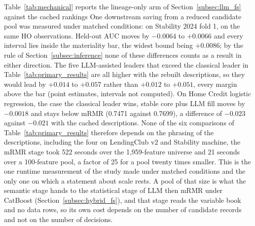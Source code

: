 \documentclass[final,5p,twocolumn]{elsarticle}
\providecommand{\DIFaddtex}[1]{{\protect\color{blue} \sf #1}} %
\providecommand{\DIFdeltex}[1]{{\protect\color{red} \scriptsize #1}} %
\providecommand{\DIFaddbegin}{} %
\providecommand{\DIFaddend}{} %
\providecommand{\DIFdelbegin}{} %
\providecommand{\DIFdelend}{} %
\providecommand{\DIFadd}[1]{\texorpdfstring{\DIFaddtex{#1}}{#1}} %
\providecommand{\DIFdel}[1]{\texorpdfstring{\DIFdeltex{#1}}{}} %
\begin{document}
\DIFdelbegin \DIFdel{Table~\ref{tab:mechanical} reports the lineage-only arm of Section~\ref{subsec:llm_fs} against the cached rankings}\DIFdelend \DIFaddbegin \DIFadd{One downstream saving from a reduced candidate pool was measured under matched conditions: on Stability 2024 fold 1}\DIFaddend , on the same \DIFdelbegin \DIFdel{HO observations. Held-out AUC moves by $-0.0064$ to $+0.0066$ and every interval lies inside the materiality bar, the widest bound being $+0.0086$; by the rule of Section~\ref{subsec:inference} none of these differences counts as a result in either direction. The five LLM-assisted leaders that exceed the classical leader in Table~\ref{tab:primary_results} are all higher with the rebuilt descriptions, so they would lead by $+0.014$ to $+0.057$ rather than $+0.012$ to $+0.051$, every margin above the bar (point estimates, intervals not computed). On Home Credit logistic regression, the case the classical leader wins, stable core plus LLM fill moves by $-0.0018$ and stays below mRMR (0.7471 against 0.7699), a difference of $-0.023$ against $-0.021$ with the cached descriptions. None of the six comparisons of Table~\ref{tab:primary_results} therefore depends on the phrasing of the descriptions, including the four on LendingClub v2 and Stability }\DIFdelend \DIFaddbegin \DIFadd{machine, the mRMR stage took 522 seconds over the 1,959-feature universe and 21 seconds over a 100-feature pool, a factor of 25 for a pool twenty times smaller. This is the one runtime measurement of the study made under matched conditions and the only one on which a statement about scale rests. A pool of that size is what the semantic stage hands to the statistical stage of LLM then mRMR under CatBoost (Section~\ref{subsec:hybrid_fs}), and that stage reads the variable book and no data rows, so its own cost depends on the number of candidate records and not on the number of decisions.
}
\end{document}
